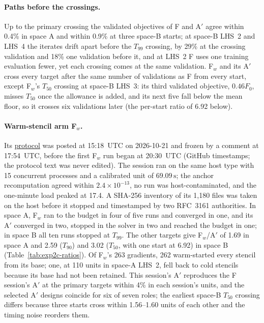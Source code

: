 \documentclass{anvil-paper}
\begin{document}
\paragraph{Paths before the crossings.}
Up to the primary crossing the validated objectives of F and A$'$ agree
within 0.4\% in space A and within 0.9\% at three space-B starts; at
space-B LHS~2 and LHS~4 the iterates drift apart before the $T_{99}$
crossing, by 29\% at the crossing validation and 18\% one validation
before it, and at LHS~2 F uses one training evaluation fewer, yet each
crossing comes at the same validation. F$_w$ and its A$'$ cross every
target after the same number of validations as F from every start, except
F$_w$'s $T_{50}$ crossing at space-B LHS~3: its third validated objective,
$0.46F_0$, misses $T_{50}$ once the allowance is added, and its next five
fall below the mean floor, so it crosses six validations later (the
per-start ratio of 6.92 below).

\paragraph{Warm-stencil arm F$_w$.}
Its \href{https://github.com/rjwalters/geode-fem/issues/1224}{protocol} was
posted at 15:18~UTC on 2026-10-21 and frozen by a comment at 17:54~UTC,
before the first F$_w$ run began at 20:30~UTC (GitHub timestamps; the
protocol text was never edited). The session ran on the same host type with
15 concurrent processes and a calibrated unit of $69.09\,\mathrm{s}$; the
anchor recomputation agreed within $2.4\times10^{-13}$, no run was
host-contaminated, and the one-minute load peaked at 17.4. A SHA-256
inventory of its 1,180 files was taken on the host before it stopped and
timestamped by two RFC~3161 authorities. In space A, F$_w$ ran to the budget
in four of five runs and converged in one, and its A$'$ converged in two,
stopped in the solver in two and reached the budget in one; in space B all
ten runs stopped at $T_{99}$. The other targets give F$_w$/A$'$ of 1.69 in
space A and 2.59 ($T_{90}$) and 3.02 ($T_{50}$, with one start at 6.92) in
space B (Table~\ref{tab:exp2c-ratios}). Of F$_w$'s 263 gradients, 262
warm-started every stencil from its base; one, at 110 units in space-A
LHS~2, fell back to cold stencils because its base had not been retained.
This session's A$'$ reproduces the F session's A$'$ at the primary targets
within 4\% in each session's units, and the selected A$'$ designs coincide
for six of seven roles; the earliest space-B $T_{50}$ crossing differs
because three starts cross within 1.56--1.60 units of each other and the
timing noise reorders them.
\end{document}
